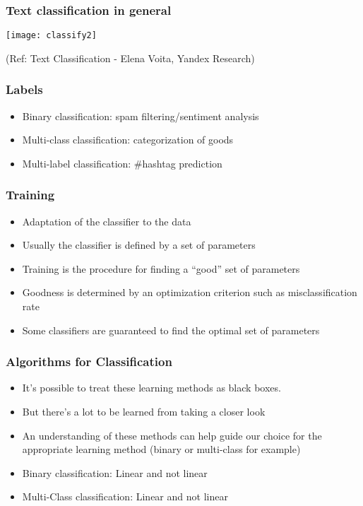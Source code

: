 \begin{frame}[fragile]
  \frametitle{Text classification in general}
\begin{center}
\texttt{[image: classify2]}
\end{center}

{\tiny (Ref: Text Classification - Elena Voita, Yandex Research)}
\end{frame}

\begin{frame}[fragile]
  \frametitle{Labels}
\begin{itemize}
\item Binary classification: spam filtering/sentiment analysis
\item Multi-class classification: categorization of goods
\item  Multi-label classification: \#hashtag prediction
\end{itemize}
\end{frame}


\begin{frame}[fragile]
  \frametitle{Training}
\begin{itemize}
\item Adaptation of the classifier to the data
\item Usually the classifier is defined by a set of parameters
\item Training is the procedure for finding a ``good'' set of parameters
\item Goodness is determined by an optimization criterion such as misclassification rate
\item Some classifiers are guaranteed to find the optimal set of parameters
\end{itemize}
\end{frame}


\begin{frame}[fragile]
  \frametitle{Algorithms for Classification}
\begin{itemize}
\item It's possible to treat these learning methods as black boxes. 
\item But there's a lot to be learned from taking a closer look 
\item An understanding of these methods can help guide our choice for the appropriate learning method (binary or multi-class for example)
\item Binary classification: Linear and not linear
\item Multi-Class classification: Linear and not linear
\end{itemize}
\end{frame}

